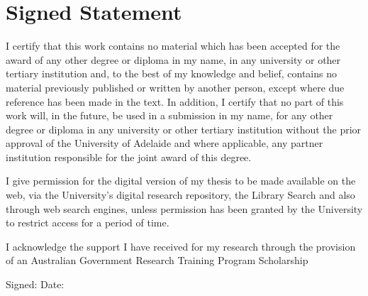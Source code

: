 \chapter{Signed Statement}
 {
  I certify that this work contains no material which has been accepted for the award of any other degree or diploma in my name, in any
  university or other tertiary institution and, to the best of my knowledge and belief, contains no material previously published or written by
  another person, except where due reference has been made in the text. In addition, I certify that no part of this work will, in the future, be used
  in a submission in my name, for any other degree or diploma in any university or other tertiary institution without the prior approval of the
  University of Adelaide and where applicable, any partner institution responsible for the joint award of this degree.

  I give permission for the digital version of my thesis to be made available on the web, via the University’s digital research repository, the
  Library Search and also through web search engines, unless permission has been granted by the University to restrict access for a period of
  time.

  I acknowledge the support I have received for my research through the provision of an Australian Government Research Training Program
  Scholarship

  \vspace{4ex}
  Signed: \dotfill\quad
  Date: \dotfill

 }
